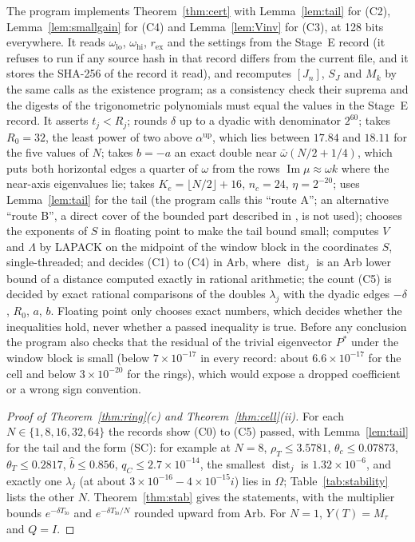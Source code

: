 \documentclass[11pt]{article}
\theoremstyle{definition}
\newcommand{\im}{\operatorname{Im}}
\begin{document}
The program  implements Theorem~\ref{thm:cert} with Lemma~\ref{lem:tail} for (C2), Lemma~\ref{lem:smallgain} for (C4) and Lemma~\ref{lem:Vinv} for (C3), at 128 bits everywhere. It reads $\omega_{\mathrm{lo}}$, $\omega_{\mathrm{hi}}$, $r_{\mathrm{ex}}$ and the settings from the Stage~E record (it refuses to run if any source hash in that record differs from the current file, and it stores the SHA-256 of the record it read), and recomputes $[J_n]$, $S_J$ and $M_k$ by the same calls as the existence program; as a consistency check their suprema and the digests of the trigonometric polynomials must equal the values in the Stage~E record. It asserts $t_j < R_j$; rounds $\delta$ up to a dyadic with denominator $2^{60}$; takes $R_0 = 32$, the least power of two above $\alpha^{\mathrm{up}}$, which lies between $17.84$ and $18.11$ for the five values of $N$; takes $b = -a$ an exact double near $\bar\omega(N/2 + 1/4)$, which puts both horizontal edges a quarter of $\omega$ from the rows $\im\mu \approx \omega k$ where the near-axis eigenvalues lie; takes $K_e = \lfloor N/2\rfloor + 16$, $n_c = 24$, $\eta = 2^{-20}$; uses Lemma~\ref{lem:tail} for the tail (the program calls this ``route A''; an alternative ``route B'', a direct cover of the bounded part described in , is not used); chooses the exponents of $S$ in floating point to make the tail bound small; computes $V$ and $\Lambda$ by LAPACK on the midpoint of the window block in the coordinates $S$, single-threaded; and decides (C1) to (C4) in Arb, where $\operatorname{dist}_j$ is an Arb lower bound of a distance computed exactly in rational arithmetic; the count (C5) is decided by exact rational comparisons of the doubles $\lambda_j$ with the dyadic edges $-\delta$, $R_0$, $a$, $b$. Floating point only chooses exact numbers, which decides whether the inequalities hold, never whether a passed inequality is true. Before any conclusion the program also checks that the residual of the trivial eigenvector $P^*$ under the window block is small (below $7 \times 10^{-17}$ in every record: about $6.6 \times 10^{-17}$ for the cell and below $3 \times 10^{-20}$ for the rings), which would expose a dropped coefficient or a wrong sign convention.

\begin{proof}[Proof of Theorem~\ref{thm:ring}(c) and Theorem~\ref{thm:cell}(ii)]
For each $N \in \{1, 8, 16, 32, 64\}$ the records  show (C0) to (C5) passed, with Lemma~\ref{lem:tail} for the tail and the form (SC): for example at $N = 8$, $\rho_T \le 3.5781$, $\theta_c \le 0.07873$, $\theta_T \le 0.2817$, $\hat b \le 0.856$, $q_C \le 2.7 \times 10^{-14}$, the smallest $\operatorname{dist}_j$ is $1.32 \times 10^{-6}$, and exactly one $\lambda_j$ (at about $3 \times 10^{-16} - 4 \times 10^{-15}i$) lies in $\Omega$; Table~\ref{tab:stability} lists the other $N$. Theorem~\ref{thm:stab} gives the statements, with the multiplier bounds $e^{-\delta T_{\mathrm{lo}}}$ and $e^{-\delta T_{\mathrm{lo}}/N}$ rounded upward from Arb. For $N = 1$, $Y(T) = M_\tau$ and $Q = I$.
\end{proof}
\end{document}
